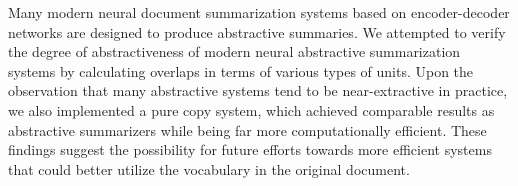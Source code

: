 Many modern neural document summarization systems based on encoder-decoder networks are designed to produce abstractive summaries. We attempted to verify the degree of abstractiveness of modern neural abstractive summarization systems by calculating overlaps in terms of various types of units. Upon the observation that many abstractive systems tend to be near-extractive in practice, we also implemented a pure copy system, which achieved comparable results as abstractive summarizers while being far more computationally efficient. These findings suggest the possibility for future efforts towards more efficient systems that could better utilize the vocabulary in the original document.
